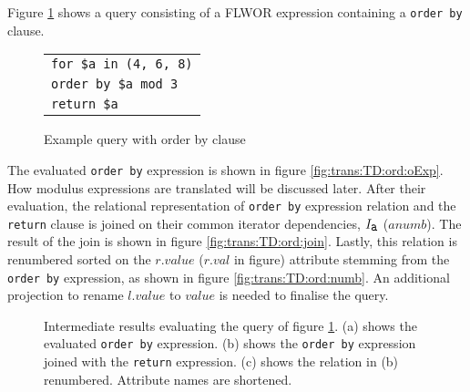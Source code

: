 \begin{myExample}
Figure \ref{fig:trans:TD:ordQu} shows a query consisting of a FLWOR expression containing a \texttt{order by} clause.
\begin{figure}[h]
\centering
\begin{tabular}{l}
\texttt{for \$a in (4, 6, 8)} \\
\texttt{order by \$a mod 3}\\
\texttt{return \$a}\\
\end{tabular}
\label{fig:trans:TD:ordQu}
\caption{Example query with order by clause}
\end{figure}

The evaluated \texttt{order by} expression is shown in figure \ref{fig:trans:TD:ord:oExp}. How modulus expressions
are translated will be discussed later. After their evaluation, the relational representation of \texttt{order by}
expression relation and the \texttt{return} clause is joined on their common iterator dependencies,
$I_{\mbox{\texttt{a}}}$ ($anumb$). The result of the join is shown in figure \ref{fig:trans:TD:ord:join}. Lastly,
this relation is renumbered sorted on the $r.value$ ($r.val$ in figure) attribute stemming from the \texttt{order by}
expression, as shown in figure \ref{fig:trans:TD:ord:numb}. An additional projection to rename $l.value$ to $value$
is needed to finalise the query.

\begin{figure}[h]
\qquad
{}
\qquad
{}


\caption{Intermediate results evaluating the query of figure
\ref{fig:trans:TD:ordQu}. (a) shows the evaluated \texttt{order by} expression. (b) shows the \texttt{order by}
expression joined with the \texttt{return} expression. (c) shows the relation in (b) renumbered. Attribute names
are shortened.\label{fig:trans:TD:orderRes}}
\end{figure}


\end{myExample}
